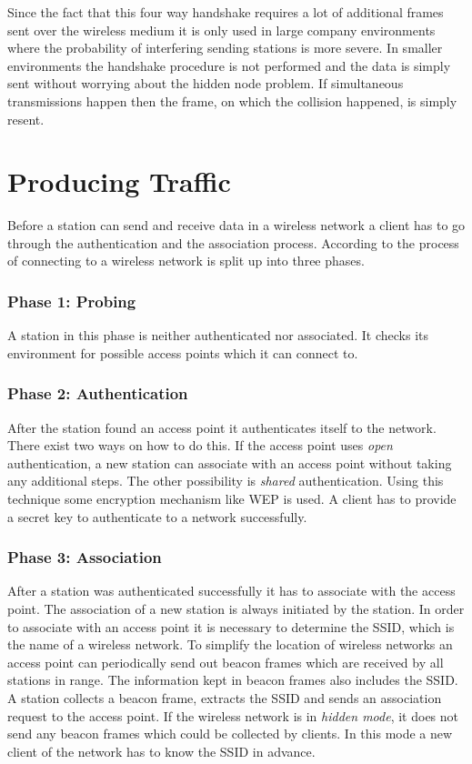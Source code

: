 Since the fact that this four way handshake requires a lot of additional frames sent over the wireless medium it is only used in large company environments where the probability of interfering sending stations is more severe. In smaller environments the handshake procedure is not performed and the data is simply sent without worrying about the hidden node problem. If simultaneous transmissions happen then the frame, on which the collision happened, is simply resent.

\section{Producing Traffic}

Before a station can send and receive data in a wireless network a client has to go through the authentication and the association process. According to \cite{authassoc} the process of connecting to a wireless network is split up into three phases.

\subsubsection{Phase 1: Probing}

A station in this phase is neither authenticated nor associated. It checks its environment for possible access points which it can connect to.

\subsubsection{Phase 2: Authentication}

After the station found an access point it authenticates itself to the network. There exist two ways on how to do this. If the access point uses {\em open} authentication, a new station can associate with an access point without taking any additional steps. The other possibility is {\em shared} authentication. Using this technique some encryption mechanism like WEP is used. A client has to provide a secret key to authenticate to a network successfully.

\subsubsection{Phase 3: Association}

After a station was authenticated successfully it has to associate with the access point. The association of a new station is always initiated by the station. In order to associate with an access point it is necessary to determine the SSID, which is the name of a wireless network. To simplify the location of wireless networks an access point can periodically send out beacon frames which are received by all stations in range. The information kept in beacon frames also includes the SSID. A station collects a beacon frame, extracts the SSID and sends an association request to the access point. If the wireless network is in {\em hidden mode}, it does not send any beacon frames which could be collected by clients. In this mode a new client of the network has to know the SSID in advance.

